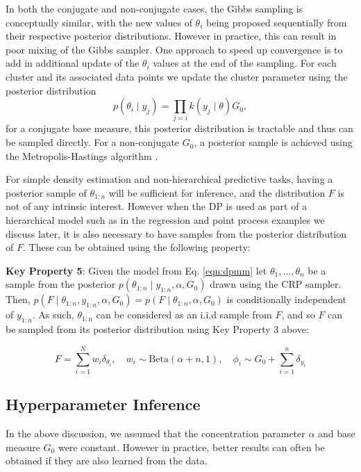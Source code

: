 \documentclass[nojss]{jss}
\begin{document}
In both the conjugate and non-conjugate cases, the Gibbs sampling is conceptually similar, with the new values of $\theta_i$ being proposed sequentially from their respective posterior distributions. However in practice, this can result in poor mixing of the Gibbs sampler. One approach to speed up convergence is to add in additional update of the $\theta_i$ values at the end of the sampling. For each cluster and its associated data points we update the cluster parameter using the posterior distribution
\begin{equation}
p (\theta _i \mid y_{j}) = \prod _{j=i} k(y_j \mid \theta) G_0,
\label{eq:clusterpost}
\end{equation}
for a conjugate base measure, this posterior distribution is tractable and thus can be sampled directly. For a non-conjugate $G_0$, a posterior sample is achieved using the Metropolis-Hastings algorithm \citep{hastings_monte_1970}.

For simple density estimation and non-hierarchical predictive tasks, having a posterior sample of $\theta_{1:n}$ will be sufficient for inference, and the distribution $F$ is not of any intrinsic interest. However when the DP is used as part of a hierarchical model such as in the regression and point process examples we discuss later, it is also necessary to have samples from the posterior distribution of $F$. These can be obtained using the following property:

\begin{tcolorbox}
\textbf{Key Property 5}: Given the model from Eq. \eqref{eqn:dpmm} let $\theta_1,\ldots,\theta_n$  be a sample from the posterior $p(\theta_{1:n} \mid y_{1:n},\alpha,G_0)$ drawn using the CRP sampler. Then, $p(F \mid \theta_{1:n},y_{1:n},\alpha,G_0) = p(F\mid\theta_{1:n},\alpha,G_0)$ is conditionally independent of $y_{1:n}$. As such, $\theta_{1:n}$ can be considered as an i.i.d sample from $F$, and so $F$ can be sampled from its posterior distribution using Key Property 3 above:

$$F = \sum_{i=1}^N w_i \delta_{\theta_i}, \quad w_i \sim \text{Beta}(\alpha+n,1), \quad \phi_i \sim G_0 + \sum_{i=1}^n \delta_{y_i}$$
\end{tcolorbox}


\subsection{Hyperparameter Inference} \label{subsec:hyperparam}

In the above discussion, we assumed that the concentration parameter $\alpha$ and base measure $G_0$ were constant. However in practice, better results can often be obtained if they are also learned from the data.
\end{document}
